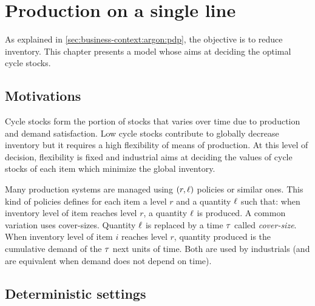 \chapter{Production on a single line}
\label{chap:lot-size:single-line}






As explained in \cref{sec:business-context:argon:pdp}, the objective is to reduce inventory.
This chapter presents a model whose aims at deciding the optimal cycle stocks.



\section{Motivations}
\label{sec:lot-size:single-line:motivations}

Cycle stocks form the portion of stocks that varies over time due to production and demand satisfaction.
Low cycle stocks contribute to globally decrease inventory but it requires a high flexibility of means of production.
At this level of decision, flexibility is fixed and industrial aims at deciding the values of cycle stocks of each item which minimize the global inventory.


Many production systems are managed using $(r,\ell)$ policies or similar ones.
This kind of policies defines for each item a level $r$ and a quantity $\ell$ such that: when inventory level of item reaches level $r$, a quantity $\ell$ is produced.
A common variation uses cover-sizes.
Quantity $\ell$ is replaced by a time $\tau$ called \emph{cover-size}.
When inventory level of item $i$ reaches level $r$, quantity produced is the cumulative demand of the $\tau$ next units of time.
Both are used by industrials (and are equivalent when demand does not depend on time).


\section{Deterministic settings}
\label{sec:lot-size:single-line:deterministic}

